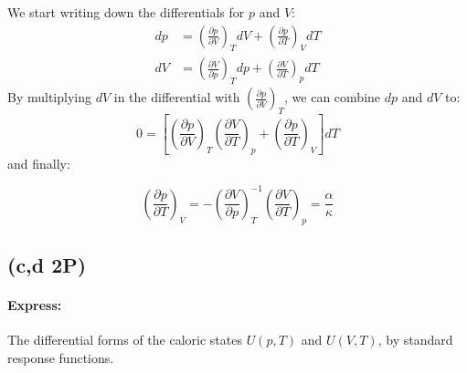 \documentclass[a4paper]{article}
\begin{document}
We start writing down the differentials for $p$ and $V$:
\begin{align}
    dp&=\left(\frac{\partial p}{\partial V}\right)_TdV+\left(\frac{\partial p}{\partial T}\right)_VdT \\
    dV&=\left(\frac{\partial V}{\partial p}\right)_Tdp+\left(\frac{\partial V}{\partial T}\right)_pdT
\end{align}
By multiplying $dV$ in the differential with $\left(\frac{\partial p}{\partial V}\right)_T$, we can combine $dp$ and $dV$ to:
\begin{equation}
    0=\left[ \left(\frac{\partial p}{\partial V}\right)_T\left(\frac{\partial V}{\partial T}\right)_p+\left(\frac{\partial p}{\partial T}\right)_V \right]dT
\end{equation}
and finally:
\begin{framed}
    \begin{equation}
        \left(\frac{\partial p}{\partial T}\right)_V=-\left(\frac{\partial V}{\partial p}\right)_T^{-1}\left(\frac{\partial V}{\partial T}\right)_p=\frac{\alpha}{\kappa}
    \end{equation}
\end{framed}
\subsection{(c,d 2P)}
\paragraph{Express:}
The differential forms of the caloric states $U(p,T)$ and $U(V,T)$, by standard response functions.
\end{document}
